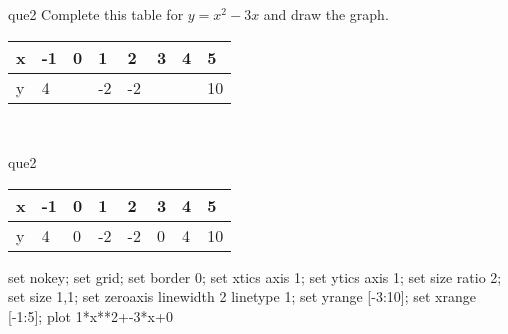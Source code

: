 \documentclass[13.5pt, varwidth=true]{beamer}
\begin{document}
\begin{frame}[shrink=19,fragile]
	\begin{beamercolorbox}[rounded=true, left, shadow=true,wd=14.8cm]{que2}
		 Complete this table for $y = x^{2} - 3x$ and draw the graph. \\[0.3cm] \renewcommand{\arraystretch}{1.2}\begin{tabular}{|C|C|C|C|C|C|C|C|} \hline x & -1 & 0 & 1 & 2 & 3 & 4 & 5 \\ \hline y & 4 &  & -2 & -2 &  &  & 10\\ \hline \end{tabular}\\[0.3cm]
	\end{beamercolorbox}
\end{frame}
\begin{frame}[shrink=19,fragile]
	\begin{beamercolorbox}[rounded=true, left, shadow=true,wd=14.8cm]{que2}
		\renewcommand{\arraystretch}{1.2}\begin{tabular}{|C|C|C|C|C|C|C|C|} \hline x & -1 & 0 & 1 & 2 & 3 & 4 & 5 \\ \hline y & 4 & 0 & -2 & -2 & 0 & 4 & 10\\ \hline \end{tabular}\begin{gnuplot}[terminal=pdf] set nokey; set grid; set border 0; set xtics axis 1; set ytics axis 1; set size ratio 2; set size 1,1; set zeroaxis linewidth 2 linetype 1; set yrange [-3:10]; set xrange [-1:5]; plot 1*x**2+-3*x+0 \end{gnuplot}
	\end{beamercolorbox}
\end{frame}
\end{document}
